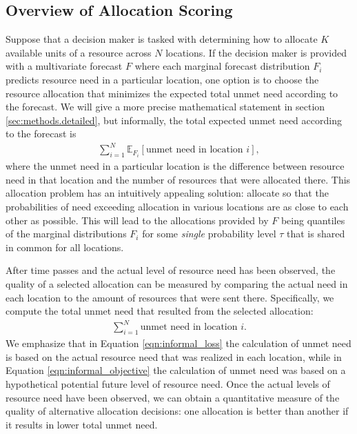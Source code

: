 \documentclass{article}\usepackage[]{graphicx}\usepackage[]{xcolor}
\begin{document}
\subsection{Overview of Allocation Scoring}
\label{sec:methods.overview}

Suppose that a decision maker is tasked with determining how to allocate $K$ available units of a resource across $N$ locations.
If the decision maker is provided with a multivariate forecast $F$ where each marginal forecast distribution $F_i$ predicts resource need in a particular location, one option is to choose the resource allocation that minimizes the expected total unmet need according to the forecast.
We will give a more precise mathematical statement in section \ref{sec:methods.detailed}, but informally, the total expected unmet need according to the forecast is
\begin{align}
\sum_{i=1}^N \mathbb{E}_{F_i}[\text{unmet need in location $i$}], \label{eqn:informal_objective}
\end{align}
where the unmet need in a particular location is the difference between resource need in that location and the number of resources that were allocated there.
This allocation problem has an intuitively appealing solution: allocate so that the probabilities of need exceeding allocation in various locations are as close to each other as possible.
This will lead to the allocations provided by $F$ being quantiles of the marginal distributions $F_i$ for some \emph{single} probability level $\tau$ that is shared in common for all locations.

After time passes and the actual level of resource need has been observed, the quality of a selected allocation can be measured by comparing the actual need in each location to the amount of resources that were sent there. Specifically, we compute the total unmet need that resulted from the selected allocation:
\begin{align}
    \sum_{i=1}^N \text{unmet need in location $i$}. \label{eqn:informal_loss}
\end{align}
We emphasize that in Equation \eqref{eqn:informal_loss} the calculation of unmet need is based on the actual resource need that was realized in each location, while in Equation \eqref{eqn:informal_objective} the calculation of unmet need was based on a hypothetical potential future level of resource need.
Once the actual levels of resource need have been observed, we can obtain a quantitative measure of the quality of alternative allocation decisions: one allocation is better than another if it results in lower total unmet need.
\end{document}
